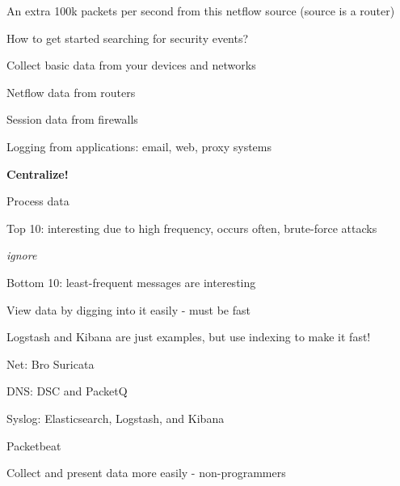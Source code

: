 \documentclass[20pt,landscape,a4paper,footrule]{foils}
\begin{document}




\centerline{An extra 100k packets per second from this netflow source (source is a router)}



\begin{list1}
\item How to get started searching for security events?
\item Collect basic data from your devices and networks
\begin{list2}
\item Netflow data from routers
\item Session data from firewalls
\item Logging from applications: email, web, proxy systems
\end{list2}
\item {\bf Centralize!}
\item Process data
\begin{list2}
\item Top 10: interesting due to high frequency, occurs often, brute-force attacks
\item {\it ignore}
\item Bottom 10: least-frequent messages are interesting
\end{list2}
\end{list1}





\begin{list1}
\item View data by digging into it easily - must be fast
\item Logstash and Kibana are just examples, but use indexing to make it fast!
\end{list1}





\begin{list1}
\item Net: Bro  Suricata 
\item DNS: DSC and PacketQ 
\item Syslog: Elasticsearch, Logstash, and Kibana
\item Packetbeat 
\end{list1}
\centerline{Collect and present data more easily - non-programmers}
\end{document}

